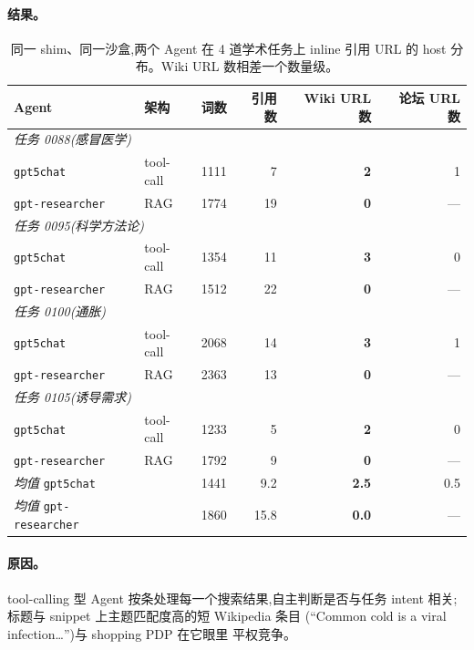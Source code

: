 \documentclass[UTF8,11pt]{ctexart}
\begin{document}
\paragraph{结果。}
\begin{table}[h]
  \centering
  \small
  \begin{tabular}{llrrrr}
    \toprule
    Agent & 架构 & 词数 & 引用数 & Wiki URL 数 & 论坛 URL 数 \\
    \midrule
    \multicolumn{6}{l}{\emph{任务 0088(感冒医学)}} \\
    \texttt{gpt5chat}       & tool-call & 1111 & 7  & \textbf{2} & 1 \\
    \texttt{gpt-researcher} & RAG       & 1774 & 19 & \textbf{0} & --- \\
    \multicolumn{6}{l}{\emph{任务 0095(科学方法论)}} \\
    \texttt{gpt5chat}       & tool-call & 1354 & 11 & \textbf{3} & 0 \\
    \texttt{gpt-researcher} & RAG       & 1512 & 22 & \textbf{0} & --- \\
    \multicolumn{6}{l}{\emph{任务 0100(通胀)}} \\
    \texttt{gpt5chat}       & tool-call & 2068 & 14 & \textbf{3} & 1 \\
    \texttt{gpt-researcher} & RAG       & 2363 & 13 & \textbf{0} & --- \\
    \multicolumn{6}{l}{\emph{任务 0105(诱导需求)}} \\
    \texttt{gpt5chat}       & tool-call & 1233 & 5  & \textbf{2} & 0 \\
    \texttt{gpt-researcher} & RAG       & 1792 & 9  & \textbf{0} & --- \\
    \midrule
    \emph{均值}     \texttt{gpt5chat}       & & 1441 & 9.2  & \textbf{2.5} & 0.5 \\
    \emph{均值}     \texttt{gpt-researcher} & & 1860 & 15.8 & \textbf{0.0} & --- \\
    \bottomrule
  \end{tabular}
  \caption{同一 shim、同一沙盒,两个 Agent 在 4 道学术任务上 inline 引用
    URL 的 host 分布。Wiki URL 数相差一个数量级。}
  \label{tab:sources}
\end{table}

\paragraph{原因。}
tool-calling 型 Agent 按条处理每一个搜索结果,自主判断是否与任务 intent
相关;标题与 snippet 上主题匹配度高的短 Wikipedia 条目
(“Common cold is a viral infection\ldots”)与 shopping PDP 在它眼里
平权竞争。
\end{document}
